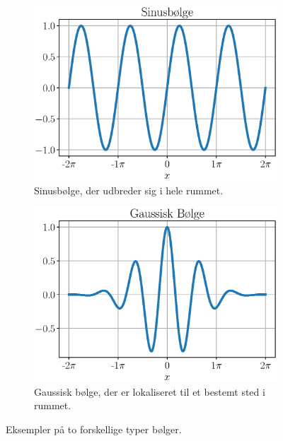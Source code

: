 \begin{figure}
    \centering
    \begin{subfigure}[t]{.47\textwidth}
        \centering
        \includegraphics[width=\columnwidth]{Akustik/fig/sine_wave.eps}
        \caption{Sinusbølge, der udbreder sig i hele rummet.}
        \label{aku:fig:sine_wave}
    \end{subfigure}
    \hfill
    \begin{subfigure}[t]{.47\textwidth}
        \centering
        \includegraphics[width=\columnwidth]{Akustik/fig/gaussian_wave.eps}
        \caption{Gaussisk bølge, der er lokaliseret til et bestemt sted i rummet.}
        \label{aku:fig:gauss_wave}
    \end{subfigure}
    \caption{Eksempler på to forskellige typer bølger.}
    \label{aku:fig:wave}
\end{figure}

